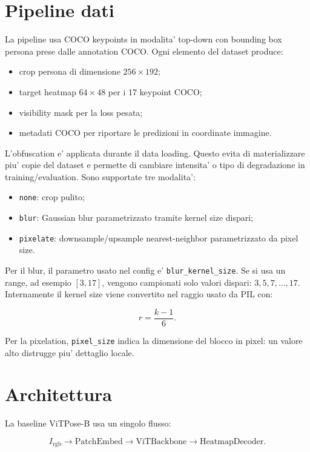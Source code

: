 \documentclass[11pt,a4paper]{article}
\newcommand{\code}[1]{\texttt{#1}}
\newcommand{\vitpose}{ViTPose-B}
\begin{document}
\section{Pipeline dati}

La pipeline usa COCO keypoints in modalita' top-down con bounding box persona
prese dalle annotation COCO. Ogni elemento del dataset produce:

\begin{itemize}[leftmargin=1.2em]
  \item crop persona di dimensione $256 \times 192$;
  \item target heatmap $64 \times 48$ per i 17 keypoint COCO;
  \item visibility mask per la loss pesata;
  \item metadati COCO per riportare le predizioni in coordinate immagine.
\end{itemize}

L'obfuscation e' applicata durante il data loading. Questo evita di materializzare
piu' copie del dataset e permette di cambiare intensita' o tipo di degradazione
in training/evaluation. Sono supportate tre modalita':

\begin{itemize}[leftmargin=1.2em]
  \item \code{none}: crop pulito;
  \item \code{blur}: Gaussian blur parametrizzato tramite kernel size dispari;
  \item \code{pixelate}: downsample/upsample nearest-neighbor parametrizzato da pixel size.
\end{itemize}

Per il blur, il parametro usato nel config e' \code{blur\_kernel\_size}. Se si
usa un range, ad esempio $[3,17]$, vengono campionati solo valori dispari:
$3,5,7,\dots,17$. Internamente il kernel size viene convertito nel raggio usato
da PIL con:

\[
  r = \frac{k - 1}{6}.
\]

Per la pixelation, \code{pixel\_size} indica la dimensione del blocco in pixel:
un valore alto distrugge piu' dettaglio locale.

\section{Architettura}

La baseline \vitpose{} usa un singolo flusso:

\[
  I_{\mathrm{rgb}} \rightarrow \mathrm{PatchEmbed}
  \rightarrow \mathrm{ViTBackbone}
  \rightarrow \mathrm{HeatmapDecoder}.
\]
\end{document}
